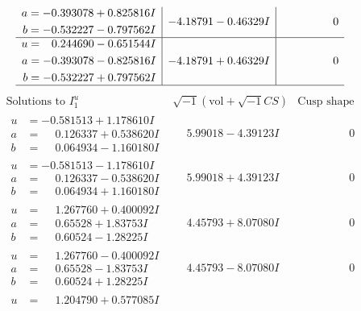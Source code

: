 \documentclass[1p]{elsarticle_modified}
\theoremstyle{definition}
\newcommand{\I}{\sqrt{-1}}
\begin{document}
$$\begin{array}{c|c|c}
\begin{aligned}
a &= -0.393078 + 0.825816 I \\
b &= -0.532227 - 0.797562 I\end{aligned}
 & -4.18791 - 0.46329 I & \phantom{-0.000000 } 0 \\ \hline\begin{aligned}
u &= \phantom{-}0.244690 - 0.651544 I \\
a &= -0.393078 - 0.825816 I \\
b &= -0.532227 + 0.797562 I\end{aligned}
 & -4.18791 + 0.46329 I & \phantom{-0.000000 } 0\\
 \hline 
 \end{array}$$\newpage$$\begin{array}{c|c|c}  
\text{Solutions to }I^u_{1}& \I (\text{vol} + \sqrt{-1}CS) & \text{Cusp shape}\\
 \hline 
\begin{aligned}
u &= -0.581513 + 1.178610 I \\
a &= \phantom{-}0.126337 + 0.538620 I \\
b &= \phantom{-}0.064934 - 1.160180 I\end{aligned}
 & \phantom{-}5.99018 - 4.39123 I & \phantom{-0.000000 } 0 \\ \hline\begin{aligned}
u &= -0.581513 - 1.178610 I \\
a &= \phantom{-}0.126337 - 0.538620 I \\
b &= \phantom{-}0.064934 + 1.160180 I\end{aligned}
 & \phantom{-}5.99018 + 4.39123 I & \phantom{-0.000000 } 0 \\ \hline\begin{aligned}
u &= \phantom{-}1.267760 + 0.400092 I \\
a &= \phantom{-}0.65528 + 1.83753 I \\
b &= \phantom{-}0.60524 - 1.28225 I\end{aligned}
 & \phantom{-}4.45793 + 8.07080 I & \phantom{-0.000000 } 0 \\ \hline\begin{aligned}
u &= \phantom{-}1.267760 - 0.400092 I \\
a &= \phantom{-}0.65528 - 1.83753 I \\
b &= \phantom{-}0.60524 + 1.28225 I\end{aligned}
 & \phantom{-}4.45793 - 8.07080 I & \phantom{-0.000000 } 0 \\ \hline\begin{aligned}
u &= \phantom{-}1.204790 + 0.577085 I \\

\end{aligned}
\end{array}$$
\end{document}
